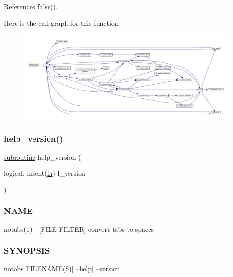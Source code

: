 References false().

Here is the call graph for this function\+:
\nopagebreak
\begin{figure}[H]
\begin{center}
\leavevmode
\includegraphics[width=350pt]{notabs_8f90_a3e09a3b52ee8fb04eeb93fe5761626a8_cgraph}
\end{center}
\end{figure}
\mbox{\label{notabs_8f90_a39c21619b08a3c22f19e2306efd7f766}} 
\subsubsection{\texorpdfstring{help\+\_\+version()}{help\_version()}}
{\footnotesize\ttfamily \hyperlink{M__stopwatch_83_8txt_acfbcff50169d691ff02d4a123ed70482}{subroutine} help\+\_\+version (\begin{DoxyParamCaption}\item[{logical, intent(\hyperlink{M__journal_83_8txt_afce72651d1eed785a2132bee863b2f38}{in})}]{l\+\_\+version }\end{DoxyParamCaption})}



\subsubsection*{N\+A\+ME}

notabs(1) -\/ \mbox{[}F\+I\+LE F\+I\+L\+T\+ER\mbox{]} convert tabs to spaces 

\subsubsection*{S\+Y\+N\+O\+P\+S\+IS}

\begin{DoxyVerb}    notabs FILENAME(S)| --help| --version
\end{DoxyVerb}


